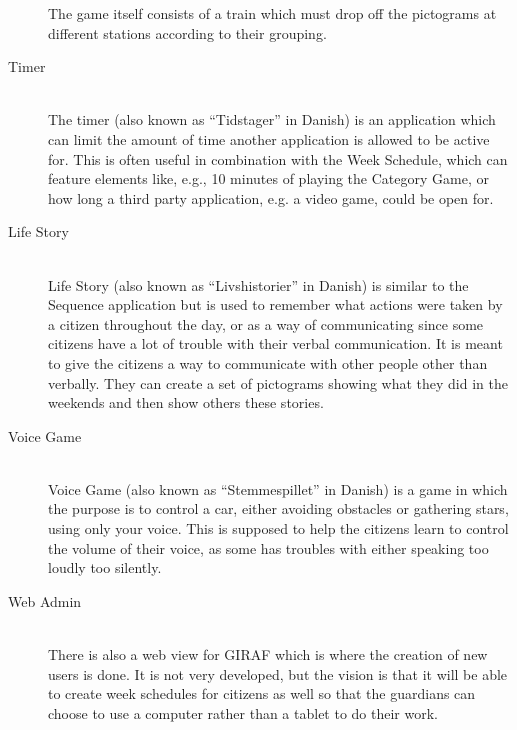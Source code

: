 \begin{description}
	The game itself consists of a train which must drop off the pictograms at different stations according to their grouping.
	\item[Timer] \hfill \\
	The timer (also known as \enquote{Tidstager} in Danish) is an application which can limit the amount of time another application is allowed to be active for.
	This is often useful in combination with the Week Schedule, which can feature elements like, e.g., 10 minutes of playing the Category Game, or how long a third party application, e.g. a video game, could be open for.
	\item[Life Story] \hfill \\
	Life Story (also known as \enquote{Livshistorier} in Danish) is similar to the Sequence application but is used to remember what actions were taken by a citizen throughout the day, or as a way of communicating since some citizens have a lot of trouble with their verbal communication.
	It is meant to give the citizens a way to communicate with other people other than verbally.
	They can create a set of pictograms showing what they did in the weekends and then show others these stories.
	\item[Voice Game] \hfill \\
	Voice Game (also known as \enquote{Stemmespillet} in Danish) is a game in which the purpose is to control a car, either avoiding obstacles or gathering stars, using only your voice.
	This is supposed to help the citizens learn to control the volume of their voice, as some has troubles with either speaking too loudly too silently.
	\item[Web Admin] \hfill \\
	There is also a web view for GIRAF which is where the creation of new users is done.
	It is not very developed, but the vision is that it will be able to create week schedules for citizens as well so that the guardians can choose to use a computer rather than a tablet to do their work.

\end{description}
